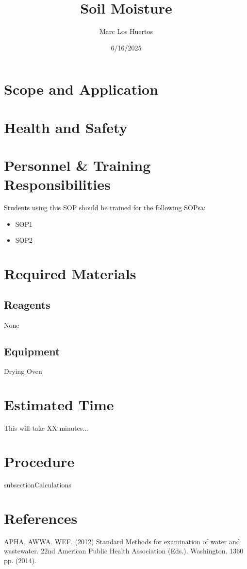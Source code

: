 \documentclass[12pt]{SOP5_beta}\usepackage[]{graphicx}\usepackage[]{xcolor}
\title{Soil Moisture}
\date{6/16/2025}
\author{Marc Los Huertos}
\begin{document}
\maketitle

\section{Scope and Application}

\NP 

\section{Health and Safety}

\NP \lipsum[2]


\section{Personnel \& Training Responsibilities}

\NP \lipsum[1]

Students using this SOP should be trained for the following SOPsa:

\begin{itemize}
  \item SOP1
  \item SOP2
\end{itemize}


\section{Required Materials}

\subsection{Reagents}

\NP None 


\subsection{Equipment}

\NP Drying Oven

\section{Estimated Time}

\NP This will take XX minutes...

\section{Procedure}

\NP 


subsection{Calculations}

\NP 


\section{References}

\NP APHA, AWWA. WEF. (2012) Standard Methods for examination of water and wastewater. 22nd American Public Health Association (Eds.). Washington. 1360 pp. (2014).
\end{document}
